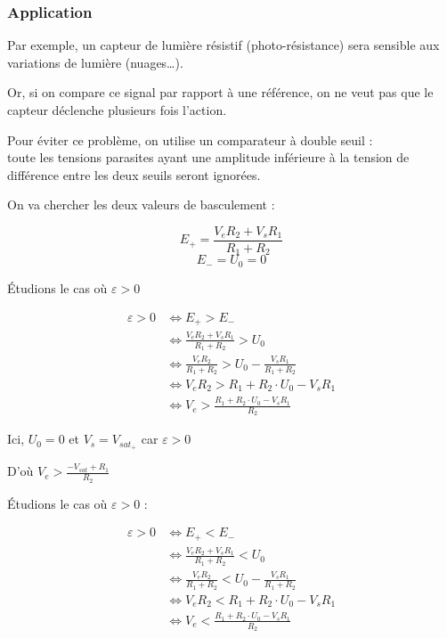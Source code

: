 \subsubsection{Application}

Par exemple, un capteur de lumière résistif (photo-résistance) sera sensible aux variations de lumière (nuages…). \\


Or, si on compare ce signal par rapport à une référence, on ne veut pas que le capteur déclenche plusieurs fois l’action.


Pour éviter ce problème, on utilise un comparateur à double seuil : \\
toute les tensions parasites ayant une amplitude inférieure à la tension de différence entre les deux seuils seront ignorées.\\


On va chercher les deux valeurs de basculement : 

$$E_+ = \frac{V_eR_2 + V_s R_1}{R_1 + R_2}$$
$$E_- = U_0=0$$

Étudions le cas où $\varepsilon>0$

\begin{align}
\varepsilon>0 & \Leftrightarrow E_+ > E_-\\
& \Leftrightarrow \frac{V_eR_2 + V_s R_1}{R_1 + R_2} > U_0 \\
& \Leftrightarrow \frac{V_eR_2}{R_1 + R_2} > U_0 -  \frac{V_s R_1 }{R_1 + R_2} \\
& \Leftrightarrow  V_eR_2 > R_1 + R_2 \cdot  U_0 -  V_s R_1 \\
& \Leftrightarrow  V_e > \frac{R_1 + R_2 \cdot  U_0 -  V_s R_1}{R_2}
\end{align}

Ici, $U_0=0$ et $V_s=V_{sat_+}$ car $\varepsilon>0$

D'où $V_e > \frac{-V_{sat} + R_1}{R_2}$




Étudions le cas où $\varepsilon>0$ : 

\begin{align}
\varepsilon>0 & \Leftrightarrow E_+ < E_-\\
& \Leftrightarrow \frac{V_eR_2 + V_s R_1}{R_1 + R_2} < U_0 \\
& \Leftrightarrow  \frac{V_eR_2}{R_1 + R_2} < U_0 -  \frac{V_s R_1 }{R_1 + R_2} \\
& \Leftrightarrow  V_eR_2 < R_1 + R_2 \cdot  U_0 -  V_s R_1 \\
& \Leftrightarrow  V_e < \frac{R_1 + R_2 \cdot  U_0 -  V_s R_1}{R_2}
\end{align}

